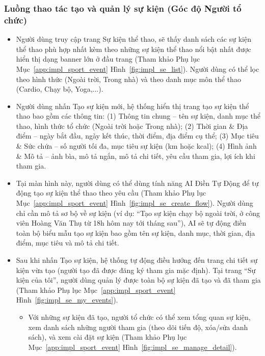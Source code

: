 \subsubsection{Luồng thao tác tạo và quản lý sự kiện (Góc độ Người tổ chức)}
\begin{itemize}
    \item Người dùng truy cập trang Sự kiện thể thao, sẽ thấy danh sách các sự kiện thể thao phù hợp nhất kèm theo những sự kiện thể thao nổi bật nhất được hiển thị dạng banner lớn ở đầu trang (Tham khảo Phụ lục Mục~\ref{app:impl_sport_event} Hình~\ref{fig:impl_se_list}). Người dùng có thể lọc theo hình thức (Ngoài trời, Trong nhà) và theo danh mục môn thể thao (Cardio, Chạy bộ, Yoga,...).


    \item Người dùng nhấn Tạo sự kiện mới, hệ thống hiển thị trang tạo sự kiện thể thao bao gồm các thông tin: (1) Thông tin chung -- tên sự kiện, danh mục thể thao, hình thức tổ chức (Ngoài trời hoặc Trong nhà); (2) Thời gian \& Địa điểm -- ngày bắt đầu, ngày kết thúc, thời điểm, địa điểm cụ thể; (3) Mục tiêu \& Sức chứa -- số người tối đa, mục tiêu sự kiện (km hoặc kcal); (4) Hình ảnh \& Mô tả -- ảnh bìa, mô tả ngắn, mô tả chi tiết, yêu cầu tham gia, lợi ích khi tham gia.

    \item Tại màn hình này, người dùng có thể dùng tính năng AI Điền Tự Động để tự động tạo sự kiện thể thao theo yêu cầu (Tham khảo Phụ lục Mục~\ref{app:impl_sport_event} Hình~\ref{fig:impl_se_create_flow}). Người dùng chỉ cần mô tả sơ bộ về sự kiện (ví dụ: ``Tạo sự kiện chạy bộ ngoài trời, ở công viên Hoàng Văn Thụ từ 18h hôm nay tới tháng sau''), AI sẽ tự động điền toàn bộ biểu mẫu tạo sự kiện bao gồm tên sự kiện, danh mục, thời gian, địa điểm, mục tiêu và mô tả chi tiết.


    \item Sau khi nhấn Tạo sự kiện, hệ thống tự động điều hướng đến trang chi tiết sự kiện vừa tạo (người tạo đã được đăng ký tham gia mặc định). Tại trang ``Sự kiện của tôi'', người dùng quản lý được toàn bộ sự kiện đã tạo và đã tham gia (Tham khảo Phụ lục Mục~\ref{app:impl_sport_event} Hình~\ref{fig:impl_se_my_events}).


    \begin{itemize}
        \item Với những sự kiện đã tạo, người tổ chức có thể xem tổng quan sự kiện, xem danh sách những người tham gia (theo dõi tiến độ, xóa/sửa danh sách), và xem cài đặt sự kiện (Tham khảo Phụ lục Mục~\ref{app:impl_sport_event} Hình~\ref{fig:impl_se_manage_detail}).



\end{itemize}
\end{itemize}
